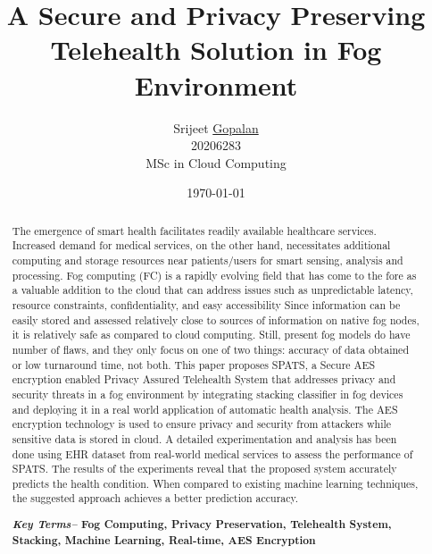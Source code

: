 \documentclass[10pt]{article}
\begin{document}
\title{A Secure and Privacy Preserving Telehealth Solution in Fog Environment }%

\author{Srijeet \underline{Gopalan} \\ 20206283 \\ MSc in Cloud Computing}%

\date{}
\date{\today}%
\maketitle



\begin{abstract} %
 
The emergence of smart health facilitates readily available healthcare services. Increased demand for medical services, on the other hand, necessitates additional computing and storage resources near patients/users for smart sensing, analysis and processing. Fog computing (FC) is a rapidly evolving field that has come to the fore as a valuable addition to the cloud that can address issues such as unpredictable latency, resource constraints, confidentiality, and easy accessibility Since information can be easily stored and assessed relatively close to sources of information on native fog nodes, it is relatively safe as compared to cloud computing. Still, present fog models do have number of flaws, and they only focus on one of two things: accuracy of data obtained or low turnaround time, not both. This paper proposes SPATS, a Secure AES encryption enabled Privacy Assured Telehealth System that addresses privacy and security threats in a fog environment by integrating stacking classifier in fog devices and deploying it in a real world application of automatic health analysis. The AES encryption technology is used to ensure privacy and security from attackers while sensitive data is stored in cloud. A detailed experimentation and analysis has been done using EHR dataset from real-world medical services to assess the performance of SPATS. The results of the experiments reveal that the proposed system accurately predicts the health condition. When compared to existing machine learning techniques, the suggested approach achieves a better prediction accuracy.

\newline

\newline \textbf{ \textit{Key Terms--} Fog Computing, Privacy Preservation, Telehealth System, Stacking, Machine Learning, Real-time, AES Encryption}
\end{abstract}
\end{document}
